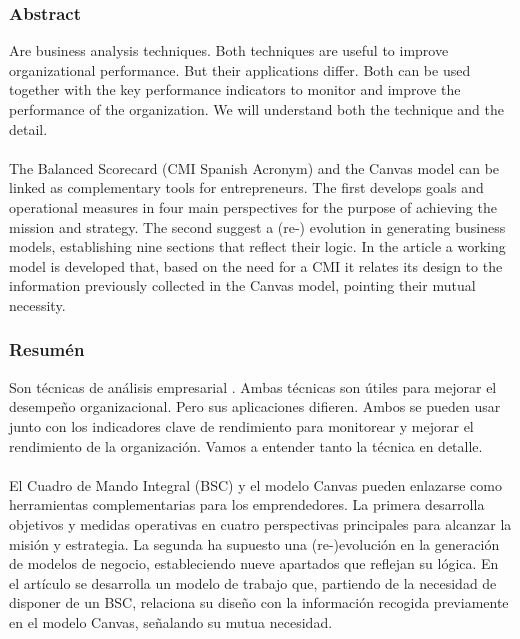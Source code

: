 \begin{center}
\subsubsection*{Abstract}
\end{center}
\item{Are business analysis techniques. Both techniques are useful to improve organizational performance. But their applications differ. Both can be used together with the key performance indicators to monitor and improve the performance of the organization. We will understand both the technique and the detail.
\\
\textbf{}
\\
The Balanced Scorecard (CMI Spanish Acronym) and the Canvas model can be linked as complementary tools for entrepreneurs. The first develops goals and operational measures in four main perspectives for the purpose of achieving the mission and strategy. The second suggest a (re-) evolution in generating business models, establishing nine sections that reflect their logic. In the article a working model is developed that, based on the need for a CMI it relates its design to the information previously collected in the Canvas model, pointing their mutual necessity.}

\begin{center}
\subsubsection*{Resumén}
\end{center}
\item{Son técnicas de análisis empresarial . Ambas técnicas son útiles para mejorar el desempeño organizacional. Pero sus aplicaciones difieren. Ambos se pueden usar junto con los indicadores clave de rendimiento para monitorear y mejorar el rendimiento de la organización. Vamos a entender tanto la técnica en detalle.
\\
\textbf{}
\\
El Cuadro de Mando Integral (BSC) y el modelo Canvas pueden enlazarse como herramientas complementarias para los emprendedores. La primera desarrolla objetivos y medidas operativas en cuatro perspectivas principales para alcanzar la misión y estrategia. La segunda ha supuesto una (re-)evolución en la generación de modelos de negocio, estableciendo nueve apartados que reflejan su lógica. En el artículo se desarrolla un modelo de trabajo que, partiendo de la necesidad de disponer de un BSC, relaciona su diseño con la información recogida previamente en el modelo Canvas, señalando su mutua necesidad.}

